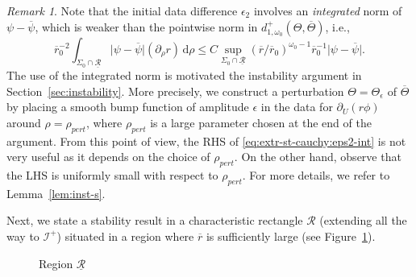 \documentclass[10pt, reqno]{amsart}
\theoremstyle{definition}
\theoremstyle{remark}
\newtheorem{remark}[theorem]{Remark}
\theoremstyle{conjecture}
\numberwithin{equation}{section}
\newcommand{\abs}[1]{\vert#1\vert}
\newcommand{\ud}{\mathrm{d}}
\newcommand{\rd}{\partial}
\newcommand{\0}{\emptyset}
\newcommand{\eps}{\epsilon}
\newcommand{\Sgm}{\Sigma}
\newcommand{\Tht}{\Theta}
\newcommand{\omg}{\omega}
\newcommand{\calI}{\mathcal I}
\newcommand{\calR}{\mathcal R}
\newcommand{\NI}{\calI^{+}}						%
\newcommand{\psibg}{\overline{\psi}}				%
\newcommand{\rbg}{\overline{r}}					%
\begin{document}
\begin{remark} \label{rem:extr-st-cauchy}
Note that the initial data difference $\eps_{2}$ involves an \emph{integrated} norm of $\psi - \psibg$, which is weaker than the pointwise norm in $d_{1, \omg_0}^{+}(\Tht, \overline{\Tht})$, i.e., 
\begin{equation} \label{eq:extr-st-cauchy:eps2-int}
	\rbg_{0}^{-2} \int_{\Sgm_{0} \cap \underline{\calR}} \abs{\psi - \psibg} (\rd_{\rho} r) \, \ud \rho \leq C \sup_{\Sgm_{0} \cap \underline{\calR}} (\rbg / \rbg_{0})^{\omg_0-1} \rbg_{0}^{-1} \abs{\psi - \psibg}.
\end{equation}
The use of the integrated norm is motivated the instability argument in Section~\ref{sec:instability}. More precisely, we construct a perturbation $\Tht = \Tht_{\eps}$ of $\overline{\Tht}$ by placing a smooth bump function of amplitude $\eps$ in the data for $\rd_{U}(r \phi)$ around $\rho = \rho_{pert}$, where $\rho_{pert}$ is a large parameter chosen at the end of the argument. From this point of view, the RHS of \eqref{eq:extr-st-cauchy:eps2-int} is not very useful as it depends on the choice of $\rho_{pert}$. On the other hand, observe that the LHS is uniformly small with respect to $\rho_{pert}$. For more details, we refer to Lemma~\ref{lem:inst-s}.
\end{remark}

Next, we state a stability result in a characteristic rectangle $\calR$ (extending all the way to $\NI$) situated in a region where $\rbg$ is sufficiently large (see Figure~\ref{fig:extr-st}).
\begin{figure}[h]
\begin{center}
\def\svgwidth{250px}
 
\caption{Region $\underline{\calR}$} \label{fig:extr-st}
\end{center}
\end{figure}
\end{document}
